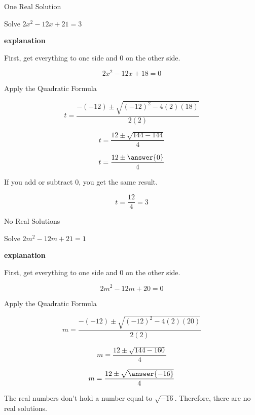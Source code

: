 \documentclass{ximera}
\begin{document}
\begin{example} One Real Solution

Solve $2 x^2 - 12x + 21 = 3$ 


\textbf{\textcolor{red!75!green}{explanation}} 


First, get everything to one side and $0$ on the other side.



\[  2 x^2 - 12x + 18 = 0  \]

Apply the Quadratic Formula


\[   t = \frac{-(-12) \pm \sqrt{(-12)^2 - 4 (2) (18)}}{2 (2)}            \]



\[   t = \frac{12 \pm \sqrt{144 - 144}}{4}            \]

\[   t = \frac{12 \pm \answer{0}}{4}            \]

If you add or subtract $0$, you get the same result.

\[   t = \frac{12}{4}   = 3         \]






\end{example}








\begin{example} No Real Solutions

Solve $2 m^2 - 12m + 21 = 1$ 


\textbf{\textcolor{red!75!green}{explanation}} 


First, get everything to one side and $0$ on the other side.



\[  2 m^2 - 12m + 20 = 0  \]

Apply the Quadratic Formula


\[   m = \frac{-(-12) \pm \sqrt{(-12)^2 - 4 (2) (20)}}{2 (2)}            \]

\[   m = \frac{12 \pm \sqrt{144 - 160}}{4}            \]

\[   m = \frac{12 \pm \sqrt{\answer{-16}}}{4}            \]



The real numbers don't hold a number equal to $\sqrt{-16}$.  Therefore, there are no real solutions.





\end{example}
\end{document}

